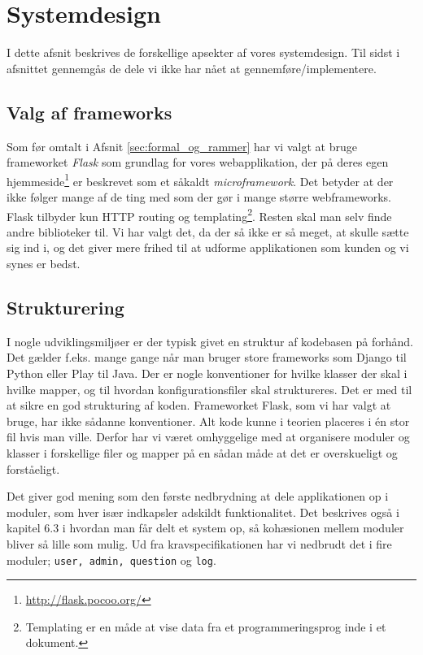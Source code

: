 \documentclass[11pt, a4paper]{article}
\begin{document}
\section{Systemdesign}
\label{sec:systemdesign}
I dette afsnit beskrives de forskellige apsekter af vores systemdesign. Til sidst i afsnittet gennemgås de dele vi ikke har nået at gennemføre/implementere.

\subsection{Valg af frameworks}
\label{sub:valg_af_frameworks}
Som før omtalt i Afsnit \ref{sec:formal_og_rammer} har vi valgt at bruge frameworket \emph{Flask} som grundlag for vores webapplikation, der på deres egen hjemmeside\footnote{\url{http://flask.pocoo.org/}} er beskrevet som et såkaldt \emph{microframework}. Det betyder at der ikke følger mange af de ting med som der gør i mange større webframeworks. Flask tilbyder kun HTTP routing og templating\footnote{Templating er en måde at vise data fra et programmeringsprog inde i et dokument.}. Resten skal man selv finde andre biblioteker til. Vi har valgt det, da der så ikke er så meget, at skulle sætte sig ind i, og det giver mere frihed til at udforme applikationen som kunden og vi synes er bedst.

\subsection{Strukturering}
\label{sub:strukturering}
I nogle udviklingsmiljøer er der typisk givet en struktur af kodebasen på forhånd. Det gælder f.eks. mange gange når man bruger store frameworks som Django til Python eller Play til Java. Der er nogle konventioner for hvilke klasser der skal i hvilke mapper, og til hvordan konfigurationsfiler skal struktureres. Det er med til at sikre en god strukturing af koden. Frameworket Flask, som vi har valgt at bruge, har ikke sådanne konventioner. Alt kode kunne i teorien placeres i én stor fil hvis man ville. Derfor har vi været omhyggelige med at organisere moduler og klasser i forskellige filer og mapper på en sådan måde at det er overskueligt og forståeligt.

Det giver god mening som den første nedbrydning at dele applikationen op i moduler, som hver især indkapsler adskildt funktionalitet. Det beskrives også i kapitel 6.3 i \cite{OOSE} hvordan man får delt et system op, så kohæsionen mellem moduler bliver så lille som mulig. Ud fra kravspecifikationen har vi nedbrudt det i fire moduler; \texttt{user, admin, question} og \texttt{log}.
\end{document}
